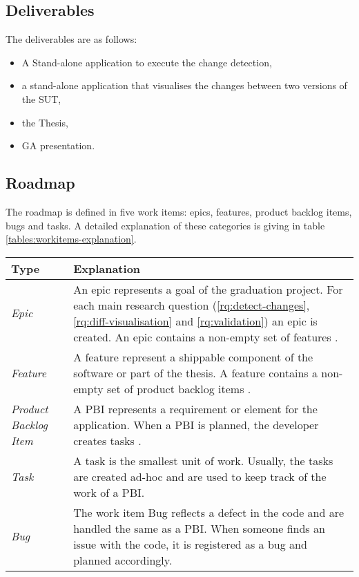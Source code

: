 \pagebreak
\subsection{Deliverables} \label{deliverables} 
The deliverables are as follows:
\begin{itemize}[noitemsep]
    \item A Stand-alone application to execute the change detection,
    \item a stand-alone application that visualises the changes between two versions of the SUT,
    \item the Thesis,
    \item GA presentation.
\end{itemize}

\subsection{Roadmap} \label{roadmap}
The roadmap is defined in five work items: epics, features, product backlog items, bugs and tasks. A detailed explanation of these categories is giving in table \ref{tables:workitems-explanation}.

\begingroup
\captionsetup{type=table}
\begin{tabularx}{\linewidth}{ 
  | >{\raggedright\arraybackslash}l
  | >{\raggedright\arraybackslash}X  |}
    \hline
    Type & Explanation \\
    \hline
    \hline
    
    \emph{Epic} & An epic represents a goal of the graduation project. For each main research question (\ref{rq:detect-changes}, \ref{rq:diff-visualisation} and \ref{rq:validation}) an epic is created. An epic contains a non-empty set of features \cite{epics-features}.\\
    \hline

    \emph{Feature} & A feature represent a shippable component of the software or part of the thesis. A feature contains a non-empty set of product backlog items \cite{epics-features}. \\
    \hline
    
    \emph{Product Backlog Item} & A \acrfull{PBI} represents a requirement or element for the application. When a PBI is planned, the developer creates tasks \cite{user-story}. \\
    \hline
    
    \emph{Task} & A task is the smallest unit of work. Usually, the tasks are created ad-hoc and are used to keep track of the work of a PBI.  \\
    \hline

    \emph{Bug} & The work item Bug reflects a defect in the code and are handled the same as a PBI. When someone finds an issue with the code, it is registered as a bug and planned accordingly.\\
    \hline
\end{tabularx}
\label{tables:workitems-explanation}
\endgroup

